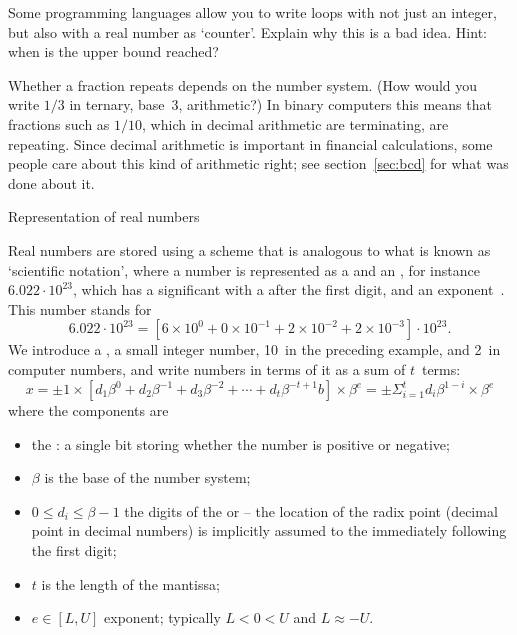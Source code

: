 \begin{exercise}
  Some programming languages allow you to write loops with not just an
  integer, but also with a real number as `counter'. Explain why this
  is a bad idea. Hint: when is the upper bound reached?
\end{exercise}

Whether a fraction repeats depends on the number system. (How would
you write $1/3$ in ternary, base~3, arithmetic?) In binary computers
this means that fractions such as $1/10$, which in decimal arithmetic
are terminating, are repeating. Since decimal arithmetic is important
in financial calculations, some
people care about this kind of arithmetic right;
see section~\ref{sec:bcd} for what was done about it.

 {Representation of real numbers}
\label{sec:float-representation}

Real numbers are stored using a scheme that is analogous to what is
known as `scientific notation', where a number is represented as a
 and an , for
instance~$6.022\cdot 10^{23}$, which has a significant  with a
 after the first digit, and an exponent~.
This number stands for
\[ 6.022\cdot 10^{23}= \left[
    6\times 10^0+0\times 10^{-1}+2\times10^{-2}+2\times10^{-3}
    \right] \cdot 10^{23}. 
\]
We introduce a , 
a small integer number, 10~in the preceding example, and 2~in computer
numbers, and write numbers in terms of it as a sum of $t$~terms:
\begin{equation}
    x = \pm 1 \times \left[
       d_1\beta^0+d_2\beta^{-1}+d_3\beta^{-2}+\cdots+d_t\beta^{-t+1}b\right] \times \beta^e =
       \pm \Sigma_{i=1}^t d_i\beta^{1-i}  \times\beta^e
       \label{eq:floatingpoint-def}
\end{equation}
where the components are
\begin{itemize}
\item the : a single bit storing whether the
  number is positive or negative;
\item $\beta$ is the base of the number system;
\item $0\leq d_i\leq \beta-1$ the digits of the 
  or  -- the location of the radix point
  (decimal point in decimal numbers) is implicitly assumed to the
  immediately following the first digit;
\item $t$ is the length of the mantissa;
\item $e\in [L,U]$ exponent; typically $L<{0}<{U} $ and $L\approx-U$.
\end{itemize}


